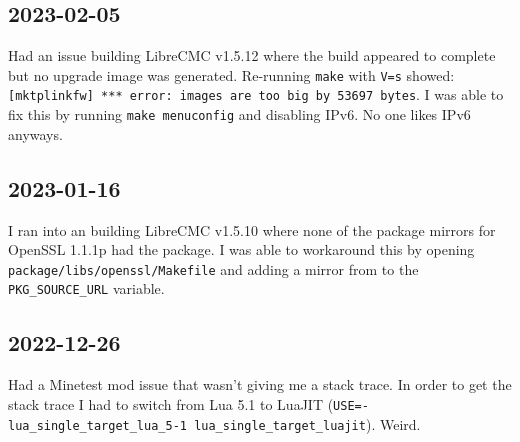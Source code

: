 \documentclass{article}
\begin{document}
\subsection{2023-02-05}
Had an issue building LibreCMC v1.5.12 where the build appeared to complete but no upgrade image was generated.  Re-running \texttt{make} with \texttt{V=s} showed: \texttt{[mktplinkfw] *** error: images are too big by 53697 bytes}.  I was able to fix this by running \texttt{make menuconfig} and disabling IPv6.  No one likes IPv6 anyways.

\subsection{2023-01-16}
I ran into an  building LibreCMC v1.5.10 where none of the package mirrors for OpenSSL 1.1.1p had the package.  I was able to workaround this by opening \texttt{package/libs/openssl/Makefile} and adding a mirror from  to the \texttt{PKG_SOURCE_URL} variable.

\subsection{2022-12-26}
Had a Minetest mod issue that wasn't giving me a stack trace.  In order to get the stack trace I had to switch from Lua 5.1 to LuaJIT (\texttt{USE=-lua_single_target_lua_5-1 lua_single_target_luajit}).  Weird.
\end{document}

